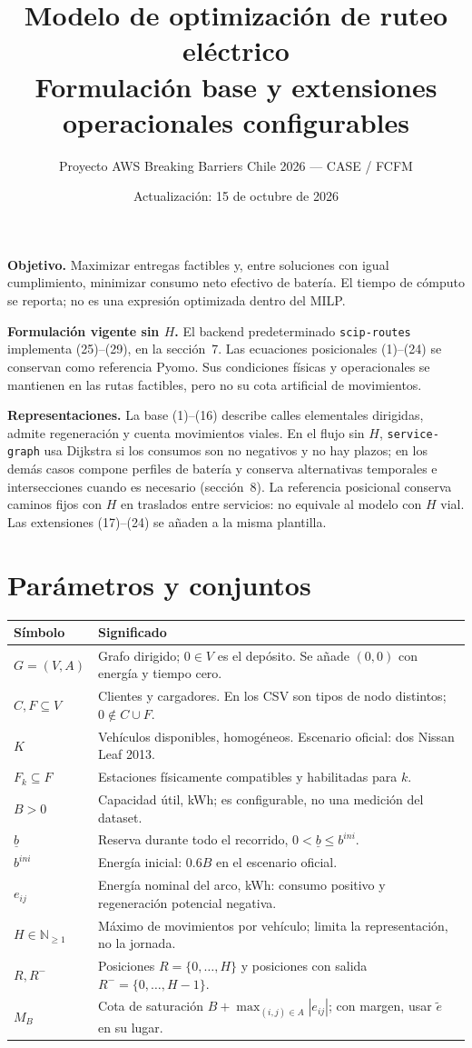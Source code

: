 \documentclass[11pt,a4paper]{article}
\title{\vspace{-1cm}Modelo de optimización de ruteo eléctrico\\
\large Formulación base y extensiones operacionales configurables}
\author{Proyecto AWS Breaking Barriers Chile 2026 --- CASE / FCFM}
\date{Actualización: 15 de octubre de 2026}
\newcommand{\Rminus}{R^{-}}
\newcommand{\reserve}{\underline b}
\newcommand{\code}[1]{\texttt{\small #1}}
\begin{document}
\maketitle

\textbf{Objetivo.} Maximizar entregas factibles y, entre soluciones con igual
cumplimiento, minimizar consumo neto efectivo de batería. El tiempo de cómputo
se reporta; no es una expresión optimizada dentro del MILP.

\textbf{Formulación vigente sin $H$.} El backend predeterminado
\code{scip-routes} implementa (25)--(29), en la sección~7.
Las ecuaciones posicionales (1)--(24) se conservan como referencia Pyomo.
Sus condiciones físicas y operacionales se mantienen en las rutas factibles,
pero no su cota artificial de movimientos.

\textbf{Representaciones.} La base (1)--(16) describe calles elementales
dirigidas, admite regeneración y cuenta movimientos viales. En el flujo sin
$H$, \code{service-graph} usa Dijkstra si los consumos son no negativos y no hay
plazos; en los demás casos compone perfiles de batería y conserva alternativas
temporales e intersecciones cuando es necesario (sección~8).
La referencia posicional conserva caminos fijos con $H$ en traslados entre
servicios: no equivale al modelo con $H$ vial. Las extensiones (17)--(24)
se añaden a la misma plantilla.

\section{Parámetros y conjuntos}
\begin{tabularx}{\textwidth}{@{}l X@{}}
\toprule
Símbolo & Significado\\\midrule
$G=(V,A)$ & Grafo dirigido; $0\in V$ es el depósito. Se añade $(0,0)$ con energía y tiempo cero.\\
$C,F\subseteq V$ & Clientes y cargadores. En los CSV son tipos de nodo distintos; $0\notin C\cup F$.\\
$K$ & Vehículos disponibles, homogéneos. Escenario oficial: dos Nissan Leaf 2013.\\
$F_k\subseteq F$ & Estaciones físicamente compatibles y habilitadas para $k$.\\
$B>0$ & Capacidad útil, kWh; es configurable, no una medición del dataset.\\
$\reserve$ & Reserva durante todo el recorrido, $0<\reserve\le b^{ini}$.\\
$b^{ini}$ & Energía inicial: $0.6B$ en el escenario oficial.\\
$e_{ij}$ & Energía nominal del arco, kWh: consumo positivo y regeneración potencial negativa.\\
$H\in\mathbb N_{\ge1}$ & Máximo de movimientos por vehículo; limita la representación, no la jornada.\\
$R,\Rminus$ & Posiciones $R=\{0,\ldots,H\}$ y posiciones con salida $\Rminus=\{0,\ldots,H-1\}$.\\
$M_B$ & Cota de saturación $B+\max_{(i,j)\in A}|e_{ij}|$; con margen, usar $\widetilde e$ en su lugar.\\
\bottomrule
\end{tabularx}
\end{document}
